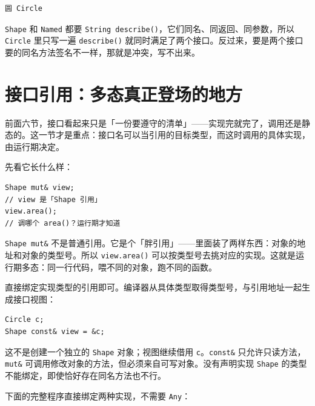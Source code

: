 \par
\medskip
\begin{lstlisting}[style=out]
圆 Circle
\end{lstlisting}
\par
\medskip

\texttt{Shape} 和 \texttt{Named} 都要 \texttt{String describe(\allowbreak{})\allowbreak{}}，它们同名、同返回、同参数，所以 \texttt{Circle} 里只写一遍 \texttt{describe(\allowbreak{})\allowbreak{}} 就同时满足了两个接口。反过来，要是两个接口要的同名方法签名不一样，那就是冲突，写不出来。

\section{接口引用：多态真正登场的地方}

前面六节，接口看起来只是「一份要遵守的清单」——实现完就完了，调用还是静态的。这一节才是重点：接口名可以当引用的目标类型，而这时调用的具体实现，由运行期决定。

先看它长什么样：

\par
\medskip
\begin{lstlisting}[style=chali]
Shape mut& view;
// view 是「Shape 引用」
view.area();
// 调哪个 area()？运行期才知道
\end{lstlisting}
\par
\medskip

\texttt{Shape mut\&} 不是普通引用。它是个「胖引用」——里面装了两样东西：对象的地址和对象的类型号。所以 \texttt{view.\allowbreak{}area(\allowbreak{})\allowbreak{}} 可以按类型号去挑对应的实现。这就是运行期多态：同一行代码，喂不同的对象，跑不同的函数。

直接绑定实现类型的引用即可。编译器从具体类型取得类型号，与引用地址一起生成接口视图：

\par
\medskip
\begin{lstlisting}[style=chali]
Circle c;
Shape const& view = &c;
\end{lstlisting}
\par
\medskip

这不是创建一个独立的 \texttt{Shape} 对象；视图继续借用 \texttt{c}。\texttt{const\&} 只允许只读方法，\texttt{mut\&} 可调用修改对象的方法，但必须来自可写对象。没有声明实现 \texttt{Shape} 的类型不能绑定，即使恰好存在同名方法也不行。

下面的完整程序直接绑定两种实现，不需要 \texttt{Any}：

